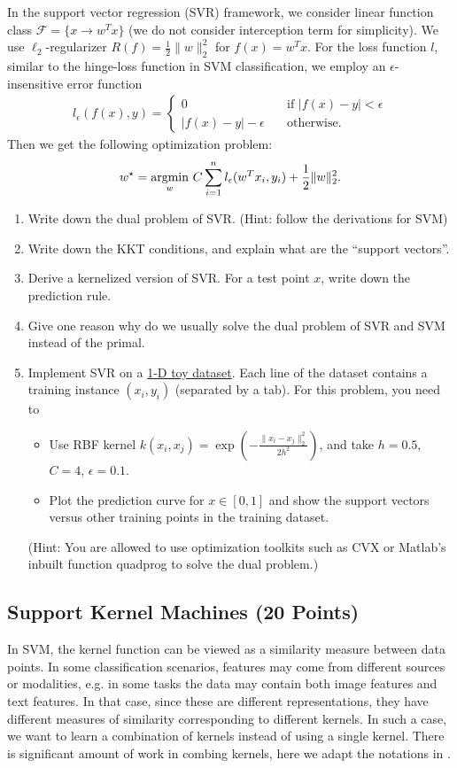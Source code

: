 In the support vector regression (SVR) framework, we consider linear function class $\mathcal{F}=\{x\to w^T x\}$ (we do not consider interception term for simplicity). We use $ \ell_2 $-regularizer $R(f) = \frac{1}{2}\|w\|_2^2$ for $f(x)=w^T x$. For the loss function $l$, similar to the hinge-loss function in SVM classification, we employ an $\epsilon$-insensitive error function
\begin{align}
l_{\epsilon}(f(x),y) =
\begin{cases}
0       &      \quad {\textrm{if } |f(x)-y| < \epsilon}\\
|f(x)-y|-\epsilon     &      \quad {\textrm{otherwise}}.
\end{cases}
\end{align}
Then we get the following optimization problem:
\begin{align}
w^\star = \operatorname*{argmin}_w\, C \sum_{i=1}^n l_\epsilon(w^T x_i,y_i) + \frac{1}{2}\|w\|_2^2.
\end{align}
\begin{enumerate}
\item Write down the dual problem of SVR. (Hint: follow the derivations for SVM)
\item Write down the KKT conditions, and explain what are the ``support vectors''.
\item Derive a kernelized version of SVR. For a test point $x$, write down the prediction rule.
\item Give one reason why do we usually solve the dual problem of SVR and SVM instead of the primal.
\item Implement SVR on a \href{http://www.cs.cmu.edu/~epxing/Class/10701-15F/files/SVR_dataset.txt}{1-D toy dataset}. Each line of the dataset contains a training instance $(x_i,y_i)$ (separated by a tab). For this problem, you need to
    \begin{itemize}
    \item Use RBF kernel $k(x_i,x_j) = \exp(-\frac{\|x_i-x_j\|_2^2}{2h^2})$, and take $h=0.5${\color{red}, $C=4$, $\epsilon=0.1$}.
    \item Plot the prediction curve for $x\in[0,1]$ and show the support vectors versus other training points in the training dataset.
    \end{itemize}
    (Hint: You are allowed to use optimization toolkits such as CVX or Matlab's inbuilt function quadprog to solve the dual problem.)
\end{enumerate}
\subsection{Support Kernel Machines (20 Points)}
In SVM, the kernel function can be viewed as a similarity measure between data points. In some classification scenarios, features may come from different sources or modalities, e.g. in some tasks the data may contain both image features and text features. In that case, since these are different representations, they have different measures of similarity corresponding to different kernels. In such a case, we want to learn a combination of kernels instead of using a single kernel. There is significant amount of work in combing kernels, here we adapt the notations in \cite{bach2004multiple}.

